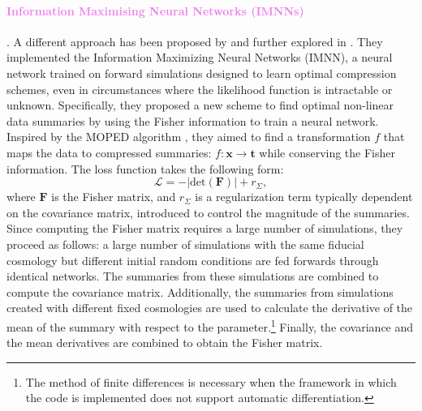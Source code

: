 \documentclass{aa}
\begin{document}
\paragraph{\textcolor{violet}
{Information Maximising Neural Networks (IMNNs)}}. 
A different approach has been proposed by \cite{charnock2018automatic} and further explored in \citet{Makinen_2021, Makinen_2022}. They implemented the Information Maximizing Neural Networks (IMNN), a neural network trained on forward simulations designed to learn optimal compression schemes, even in circumstances where the likelihood function is intractable or unknown.
Specifically, they proposed a new scheme to find optimal non-linear data summaries by using the Fisher information to train a neural network. 
Inspired by the MOPED algorithm \citep{heavens2000massive}, they aimed to find a transformation $f$ that maps the data to compressed summaries: $f: \textbf{x} \to \textbf{t}$ while conserving the Fisher information.  
The loss function takes the following form:
\begin{equation}\label{eq:loss_imnn}
    \mathcal{L} = -  |\text{det}(\textbf{F})|+ r_{\Sigma},
\end{equation}
where $\textbf{F}$ is the Fisher matrix, and $r_{\Sigma}$ is a regularization term typically dependent on the covariance matrix,  introduced to control the magnitude of the summaries.
Since computing the Fisher matrix requires a large number of simulations, they proceed as follows: a large number of simulations with the same fiducial cosmology but different initial random conditions are fed forwards through identical networks. The summaries from these simulations are combined to compute the covariance matrix. Additionally, the summaries from simulations created with different fixed cosmologies are used to calculate the derivative of the mean of the summary with respect to the parameter.\footnote{The method of finite differences is necessary when the framework in which the code is implemented does not support automatic differentiation.} Finally, the covariance and the mean derivatives are combined to obtain the Fisher matrix.
\end{document}
